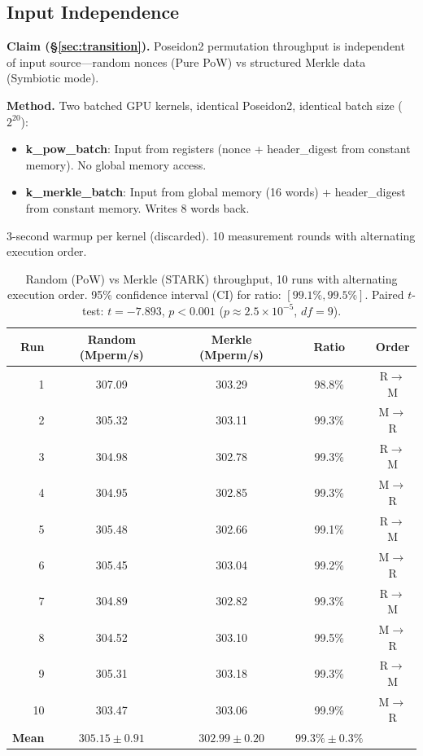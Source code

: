 \documentclass[11pt,a4paper]{article}
\begin{document}
\subsection{Input Independence}
\label{sec:gpu-invariance}

\textbf{Claim (\S\ref{sec:transition}).} Poseidon2 permutation throughput is independent of input source---random nonces (Pure PoW) vs structured Merkle data (Symbiotic mode).

\textbf{Method.} Two batched GPU kernels, identical Poseidon2, identical batch size ($2^{20}$):
\begin{itemize}
\item \textbf{k\_pow\_batch}: Input from registers (nonce + header\_digest from constant memory). No global memory access.
\item \textbf{k\_merkle\_batch}: Input from global memory (16 words) + header\_digest from constant memory. Writes 8 words back.
\end{itemize}
3-second warmup per kernel (discarded). 10 measurement rounds with alternating execution order.

\begin{table}[h]
\centering
\begin{tabular}{@{}rcccc@{}}
\toprule
Run & Random (Mperm/s) & Merkle (Mperm/s) & Ratio & Order \\
\midrule
1  & 307.09 & 303.29 & 98.8\% & R$\to$M \\
2  & 305.32 & 303.11 & 99.3\% & M$\to$R \\
3  & 304.98 & 302.78 & 99.3\% & R$\to$M \\
4  & 304.95 & 302.85 & 99.3\% & M$\to$R \\
5  & 305.48 & 302.66 & 99.1\% & R$\to$M \\
6  & 305.45 & 303.04 & 99.2\% & M$\to$R \\
7  & 304.89 & 302.82 & 99.3\% & R$\to$M \\
8  & 304.52 & 303.10 & 99.5\% & M$\to$R \\
9  & 305.31 & 303.18 & 99.3\% & R$\to$M \\
10 & 303.47 & 303.06 & 99.9\% & M$\to$R \\
\midrule
\textbf{Mean} & $\mathbf{305.15 \pm 0.91}$ & $\mathbf{302.99 \pm 0.20}$ & $\mathbf{99.3\% \pm 0.3\%}$ & \\
\bottomrule
\end{tabular}
\caption{Random (PoW) vs Merkle (STARK) throughput, 10 runs with alternating execution order. 95\% confidence interval (CI) for ratio: $[99.1\%, 99.5\%]$. Paired $t$-test: $t = -7.893$, $p < 0.001$ ($p \approx 2.5 \times 10^{-5}$, $df = 9$).}
\label{tab:invariance}
\end{table}
\end{document}

